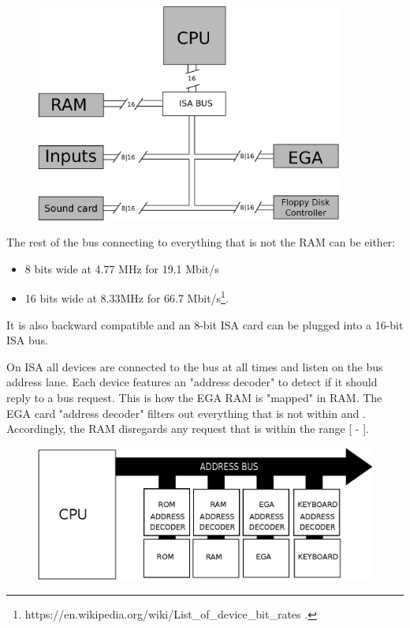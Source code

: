 \documentclass[book.tex]{subfiles}
\begin{document}
\begin{figure}[H]
\centering
      \includegraphics[width=0.9\textwidth]{imgs/drawings/bus.eps}
\end{figure}
\pagebreak
The rest of the bus connecting to everything that is not the RAM can be either:
\begin{itemize}
\item 8 bits wide at 4.77 MHz  for 19.1 Mbit/s
\item 16 bits wide at 8.33MHz for 66.7 Mbit/s\footnote{https://en.wikipedia.org/wiki/List\_of\_device\_bit\_rates .}.
\end{itemize}
It is also backward compatible and an 8-bit ISA card can be plugged into a 16-bit ISA bus.\\
\par
\vspace{10pt}
 On ISA all devices are connected to the bus at all times and listen on the bus address lane. Each device features an "address decoder" to detect if it should reply to a bus request. This is how the EGA RAM is "mapped" in RAM. The EGA card "address decoder"  filters out everything that is not within  and . Accordingly, the RAM disregards any request that is within the range [ - ].\\
\par
 \begin{figure}[H]
\centering
\includegraphics[width=\textwidth]{imgs/drawings/isa.eps}
\end{figure}
\end{document}
